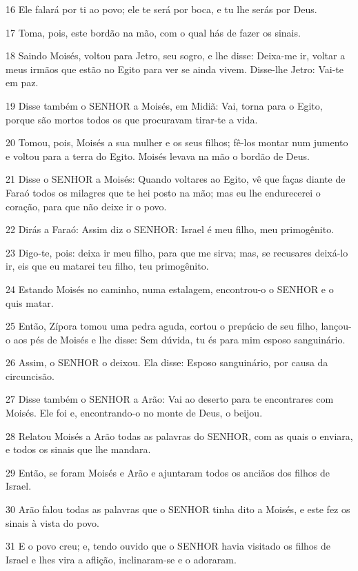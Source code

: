 \par 16 Ele falará por ti ao povo; ele te será por boca, e tu lhe serás por Deus.
\par 17 Toma, pois, este bordão na mão, com o qual hás de fazer os sinais.
\par 18 Saindo Moisés, voltou para Jetro, seu sogro, e lhe disse: Deixa-me ir, voltar a meus irmãos que estão no Egito para ver se ainda vivem. Disse-lhe Jetro: Vai-te em paz.
\par 19 Disse também o SENHOR a Moisés, em Midiã: Vai, torna para o Egito, porque são mortos todos os que procuravam tirar-te a vida.
\par 20 Tomou, pois, Moisés a sua mulher e os seus filhos; fê-los montar num jumento e voltou para a terra do Egito. Moisés levava na mão o bordão de Deus.
\par 21 Disse o SENHOR a Moisés: Quando voltares ao Egito, vê que faças diante de Faraó todos os milagres que te hei posto na mão; mas eu lhe endurecerei o coração, para que não deixe ir o povo.
\par 22 Dirás a Faraó: Assim diz o SENHOR: Israel é meu filho, meu primogênito.
\par 23 Digo-te, pois: deixa ir meu filho, para que me sirva; mas, se recusares deixá-lo ir, eis que eu matarei teu filho, teu primogênito.
\par 24 Estando Moisés no caminho, numa estalagem, encontrou-o o SENHOR e o quis matar.
\par 25 Então, Zípora tomou uma pedra aguda, cortou o prepúcio de seu filho, lançou-o aos pés de Moisés e lhe disse: Sem dúvida, tu és para mim esposo sanguinário.
\par 26 Assim, o SENHOR o deixou. Ela disse: Esposo sanguinário, por causa da circuncisão.
\par 27 Disse também o SENHOR a Arão: Vai ao deserto para te encontrares com Moisés. Ele foi e, encontrando-o no monte de Deus, o beijou.
\par 28 Relatou Moisés a Arão todas as palavras do SENHOR, com as quais o enviara, e todos os sinais que lhe mandara.
\par 29 Então, se foram Moisés e Arão e ajuntaram todos os anciãos dos filhos de Israel.
\par 30 Arão falou todas as palavras que o SENHOR tinha dito a Moisés, e este fez os sinais à vista do povo.
\par 31 E o povo creu; e, tendo ouvido que o SENHOR havia visitado os filhos de Israel e lhes vira a aflição, inclinaram-se e o adoraram.

